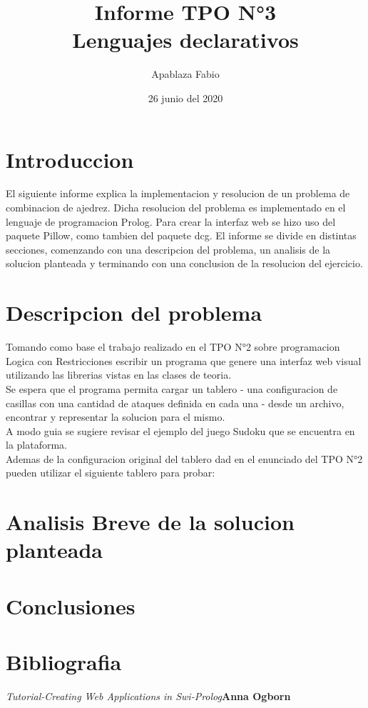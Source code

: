 \documentclass[11pt]{article}
\title{\Huge\textbf{Informe TPO N°3} \\ Lenguajes declarativos}
\author{Apablaza Fabio}
\date{26 junio del 2020}
\begin{document}
\maketitle
\newpage


\section{Introduccion}
El siguiente informe explica la implementacion y resolucion de un problema de combinacion de ajedrez. Dicha resolucion del problema es implementado en el lenguaje de programacion Prolog. Para crear la interfaz web se hizo uso del paquete Pillow, como tambien del paquete dcg. El informe se divide en distintas secciones, comenzando con una descripcion del problema, un analisis de la solucion planteada y terminando con una conclusion de la resolucion del ejercicio. 

\newpage
\section{Descripcion del problema}
\begin{Center}
Tomando como base el trabajo realizado en el TPO N°2 sobre programacion Logica con Restricciones escribir un programa que genere una interfaz web visual utilizando las librerias vistas en las clases de teoria.\\
Se espera que el programa permita cargar un tablero - una configuracion de casillas con una cantidad de ataques definida en cada una - desde un archivo, encontrar y representar la solucion para el mismo.\\
A modo guia se sugiere revisar el ejemplo del juego Sudoku que se encuentra en la plataforma.\\
Ademas de la configuracion original del tablero dad en el enunciado del TPO N°2 pueden utilizar el siguiente tablero para probar:\\

\end{Center}

\newpage
\section{Analisis Breve de la solucion planteada}


\newpage
\section{Conclusiones}

\newpage
\section{Bibliografia}
\noindent\textit{Tutorial-Creating Web Applications in Swi-Prolog}\textbf{Anna Ogborn}
\end{document}
